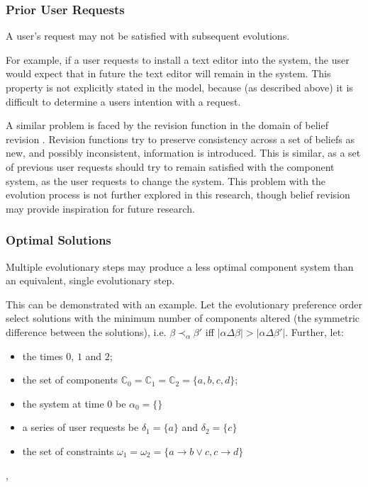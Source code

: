 \subsubsection{Prior User Requests}
\begin{obs}
A user's request may not be satisfied with subsequent evolutions.
\end{obs}
For example, if a user requests to install a text editor into the system, 
the user would expect that in future the text editor will remain in the system.
This property is not explicitly stated in the model, because (as described above) it is difficult to determine a users intention with a request.

A similar problem is faced by the revision function in the domain of belief revision \citep{alchourron1985logic}.
Revision functions try to preserve consistency across a set of beliefs as new, and possibly inconsistent, information is introduced.
This is similar, as a set of previous user requests should try to remain satisfied with the component system, as the user requests to change the system.    
This problem with the evolution process is not further explored in this research, though belief revision may provide inspiration for future research.

\subsubsection{Optimal Solutions}
\begin{obs}
Multiple evolutionary steps may produce a less optimal component system than an equivalent, single evolutionary step.
\end{obs}

This can be demonstrated with an example.
Let the evolutionary preference order select solutions with the minimum number of components altered (the symmetric difference between the solutions), 
i.e. $\beta \prec_{\alpha} \beta'$ iff $|\alpha \Delta \beta| > |\alpha \Delta \beta'|$.
Further, let:
\begin{itemize}
  \item the times $0$, $1$ and $2$;
  \item the set of components $\mathbb{C}_0 = \mathbb{C}_1 = \mathbb{C}_2 = \{a,b,c,d\}$;
  \item the system at time $0$ be $\alpha_0 = \{\}$
  \item a series of user requests be $\delta_1 = \{a\}$ and $ \delta_2 = \{c\}$
  \item the set of constraints $\omega_1 = \omega_2 = \{a \rightarrow b \vee c, c \rightarrow d\}$
\end{itemize}, 

